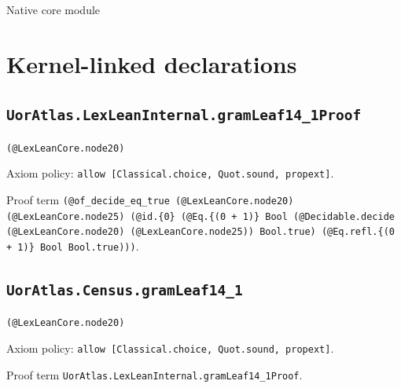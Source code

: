 \documentclass[11pt]{article}
\begin{document}
\begin{center}{\LARGE Native core module}\end{center}
\section*{Kernel-linked declarations}
\subsection*{\texttt{UorAtlas.LexLeanInternal.gramLeaf14\_1Proof}}
\noindent\texttt{(@LexLeanCore.node20)}\par
\noindent Axiom policy: \texttt{allow [Classical.choice, Quot.sound, propext]}.\par
\noindent Proof term \texttt{(@of\_decide\_eq\_true (@LexLeanCore.node20) (@LexLeanCore.node25) (@id.\{0\} (@Eq.\{(0 + 1)\} Bool (@Decidable.decide (@LexLeanCore.node20) (@LexLeanCore.node25)) Bool.true) (@Eq.refl.\{(0 + 1)\} Bool Bool.true)))}.\par
\subsection*{\texttt{UorAtlas.Census.gramLeaf14\_1}}
\noindent\texttt{(@LexLeanCore.node20)}\par
\noindent Axiom policy: \texttt{allow [Classical.choice, Quot.sound, propext]}.\par
\noindent Proof term \texttt{UorAtlas.LexLeanInternal.gramLeaf14\_1Proof}.\par
\end{document}

